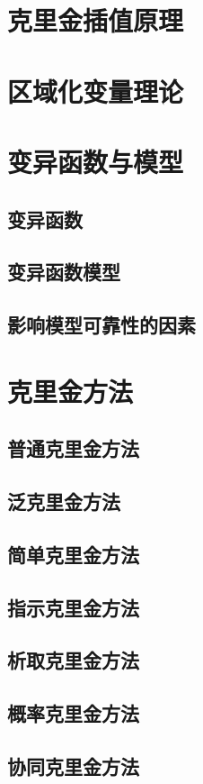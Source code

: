\section{克里金插值原理}

\section{区域化变量理论}

\section{变异函数与模型}

\subsection{变异函数}

\subsection{变异函数模型}

\subsection{影响模型可靠性的因素}

\section{克里金方法}

\subsection{普通克里金方法}

\subsection{泛克里金方法}

\subsection{简单克里金方法}

\subsection{指示克里金方法}

\subsection{析取克里金方法}

\subsection{概率克里金方法}

\subsection{协同克里金方法}